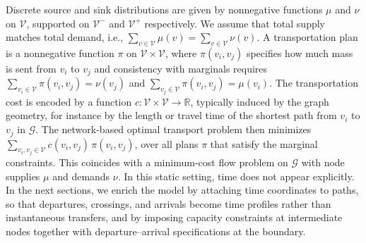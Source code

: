 \documentclass[11pt]{article}
\newcommand{\calV}{{\mathcal V}}
\newcommand{\calE}{{\mathcal E}}
\newcommand{\calG}{{\mathcal G}}
\newcommand{\calT}{{\mathcal T}}
\newcommand{\calW}{{\mathcal W}}
\newcommand{\bp}{{\mathbf p}}
\begin{document}
Discrete source and sink distributions are given by nonnegative functions $\mu$ and $\nu$ on $\calV$, supported on $\calV^-$ and $\calV^+$ respectively. We assume that total supply matches total demand, i.e.,
$\sum_{v\in\calV}\mu(v)=\sum_{v\in\calV}\nu(v)$.
A transportation plan is a nonnegative function $\pi$ on $\calV\times\calV$, where $\pi(v_i,v_j)$ specifies how much mass is sent from $v_i$ to $v_j$ and consistency with marginals requires $\sum_{v_i\in\calV}\pi(v_i,v_j)=\nu(v_j)$ and $\sum_{v_j\in\calV}\pi(v_i,v_j)=\mu(v_i)$.
The transportation cost is encoded by a function $c:\calV\times\calV\to\mathbb R$, typically induced by the graph geometry, for instance by the length or travel time of the shortest path from $v_i$ to $v_j$ in $\calG$. The network-based optimal transport problem then minimizes
$\sum_{v_i,v_j\in\calV} c(v_i,v_j)\,\pi(v_i,v_j)$,
over all plans $\pi$ that satisfy the marginal constraints. This coincides with a minimum-cost flow problem \cite{ahuja1988network} on $\calG$ with node supplies $\mu$ and demands $\nu$. In this static setting, time does not appear explicitly. In the next sections, we enrich the model by attaching time coordinates to paths, so that departures, crossings, and arrivals become time profiles rather than instantaneous transfers, and by imposing capacity constraints at intermediate nodes together with departure–arrival specifications at the boundary.



\end{document}
